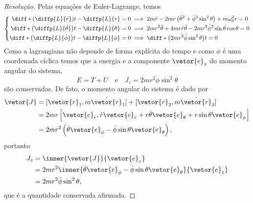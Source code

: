\begin{proof}[Resolução]
    Pelas equações de Euler-Lagrange, temos
    \begin{equation*}
        \left\{\begin{aligned}
                \diff*{\left(\diffp{L}{\dot{r}}\right)}{t} - \diffp{L}{r} = 0 &\implies 2m\ddot{r} - 2mr\left(\dot{\theta}^2 + \dot\phi^2\sin^2\theta\right) + m\omega_0^2 r = 0\\
                \diff*{\left(\diffp{L}{\dot{\theta}}\right)}{t} - \diffp{L}{\theta} = 0 &\implies 2mr^2\ddot{\theta} + 4mr\dot{r}\dot{\theta} - 2mr^2\dot\phi^2\sin\theta\cos\theta = 0\\
                \diff*{\left(\diffp{L}{\dot{\phi}}\right)}{t} - \diffp{L}{\phi} = 0 &\implies \diff*{\left(2mr^2\dot\phi\sin^2\theta\right)}{t} = 0
        \end{aligned}\right.
    \end{equation*}
    Como a lagrangiana não depende de forma explícita do tempo e como \(\phi\) é uma coordenada cíclica temos que a energia e a componente \(\vetor{e}_z\) do momento angular do sistema,
    \begin{equation*}
        E = T + U\quad\text{e}\quad J_z = 2mr^2\dot\phi\sin^2\theta
    \end{equation*}
    são conservadas. De fato, o momento angular do sistema é dado por
    \begin{align*}
        \vetor{J} &= [\vetor{r}_1, m\dot{\vetor{r}}_1] + [\vetor{r}_2, m\dot{\vetor{r}}_2]\\
                  &= 2mr\left[\vetor{e}_r, \dot{r}\vetor{e}_r + r\dot{\theta}\vetor{e}_\theta + r\sin\theta \vetor{e}_\phi\right]\\
                  &= 2mr^2 \left(\dot\theta \vetor{e}_\phi - \dot\phi\sin\theta \vetor{e}_\theta\right),
    \end{align*}
    portanto
    \begin{align*}
        J_z &= \inner{\vetor{J}}{\vetor{e}_z}\\
            &= 2mr^2\inner{\dot\theta \vetor{e}_\phi - \dot\phi\sin\theta \vetor{e}_\theta}{\vetor{e}_z}\\
            &= 2mr^2\dot\phi\sin^2\theta,
    \end{align*}
    que é a quantidade conservada afirmada.
\end{proof}

